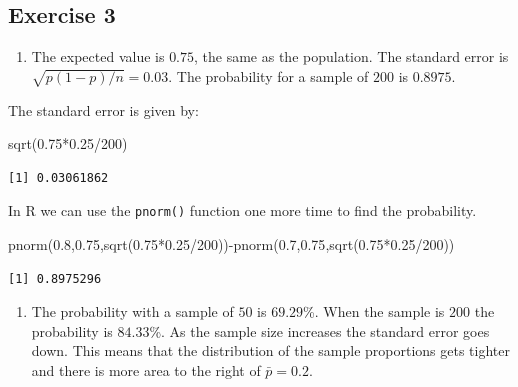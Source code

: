 \documentclass[
  letterpaper,
  DIV=11,
  numbers=noendperiod]{scrreprt}
\newenvironment{Shaded}{\begin{snugshade}}{\end{snugshade}}
\newcommand{\DecValTok}[1]{\textcolor[rgb]{0.68,0.00,0.00}{#1}}
\newcommand{\FloatTok}[1]{\textcolor[rgb]{0.68,0.00,0.00}{#1}}
\newcommand{\FunctionTok}[1]{\textcolor[rgb]{0.28,0.35,0.67}{#1}}
\newcommand{\NormalTok}[1]{\textcolor[rgb]{0.00,0.23,0.31}{#1}}
\newcommand{\SpecialCharTok}[1]{\textcolor[rgb]{0.37,0.37,0.37}{#1}}
\providecommand{\tightlist}{%
  \setlength{\itemsep}{0pt}\setlength{\parskip}{0pt}}\usepackage{longtable,booktabs,array}
\begin{document}
\hypertarget{exercise-3-21}{%
\subsection*{Exercise 3}\label{exercise-3-21}}

\begin{enumerate}
\def\labelenumi{\arabic{enumi}.}
\tightlist
\item
  The expected value is \(0.75\), the same as the population. The
  standard error is \(\sqrt{p(1-p)/n}=0.03\). The probability for a
  sample of \(200\) is \(0.8975\).
\end{enumerate}

The standard error is given by:

\begin{Shaded}
\begin{Highlighting}[numbers=left,,]
\FunctionTok{sqrt}\NormalTok{(}\FloatTok{0.75}\SpecialCharTok{*}\FloatTok{0.25}\SpecialCharTok{/}\DecValTok{200}\NormalTok{)}
\end{Highlighting}
\end{Shaded}

\begin{verbatim}
[1] 0.03061862
\end{verbatim}

In R we can use the \texttt{pnorm()} function one more time to find the
probability.

\begin{Shaded}
\begin{Highlighting}[numbers=left,,]
\FunctionTok{pnorm}\NormalTok{(}\FloatTok{0.8}\NormalTok{,}\FloatTok{0.75}\NormalTok{,}\FunctionTok{sqrt}\NormalTok{(}\FloatTok{0.75}\SpecialCharTok{*}\FloatTok{0.25}\SpecialCharTok{/}\DecValTok{200}\NormalTok{))}\SpecialCharTok{{-}}\FunctionTok{pnorm}\NormalTok{(}\FloatTok{0.7}\NormalTok{,}\FloatTok{0.75}\NormalTok{,}\FunctionTok{sqrt}\NormalTok{(}\FloatTok{0.75}\SpecialCharTok{*}\FloatTok{0.25}\SpecialCharTok{/}\DecValTok{200}\NormalTok{))}
\end{Highlighting}
\end{Shaded}

\begin{verbatim}
[1] 0.8975296
\end{verbatim}

\begin{enumerate}
\def\labelenumi{\arabic{enumi}.}
\setcounter{enumi}{1}
\tightlist
\item
  The probability with a sample of \(50\) is \(69.29\)\%. When the
  sample is \(200\) the probability is \(84.33\)\%. As the sample size
  increases the standard error goes down. This means that the
  distribution of the sample proportions gets tighter and there is more
  area to the right of \(\bar{p}=0.2\).
\end{enumerate}
\end{document}
